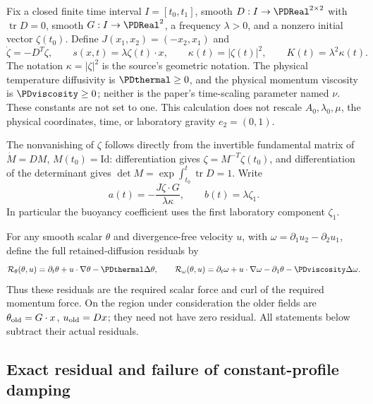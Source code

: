 Fix a closed finite time interval $I=[t_0,t_1]$, smooth
$D:I\to\PDReal^{2\times2}$ with $\operatorname{tr}D=0$, smooth
$G:I\to\PDReal^2$, a frequency $\lambda>0$, and a nonzero initial vector
$\zeta(t_0)$. Define $J(x_1,x_2)=(-x_2,x_1)$ and
\begin{equation}\label{cvlane:pd:eq:phase}
 \dot\zeta=-D^T\zeta,\qquad s(x,t)=\lambda\zeta(t)\cdot x,
 \qquad \kappa(t)=|\zeta(t)|^2,\qquad K(t)=\lambda^2\kappa(t).
\end{equation}
The notation $\kappa=|\zeta|^2$ is the source's geometric notation.
The physical temperature diffusivity is $\PDthermal\geq0$, and the physical
momentum viscosity is $\PDviscosity\geq0$; neither is the paper's time-scaling
parameter named $\nu$. These constants are not set to one. This calculation
does not rescale $A_0,\lambda_0,\mu$, the physical coordinates, time, or
laboratory gravity $e_2=(0,1)$.

The nonvanishing of $\zeta$ follows directly from the invertible fundamental
matrix of $\dot M=DM$, $M(t_0)=\mathrm{Id}$: differentiation gives
$\zeta=M^{-T}\zeta(t_0)$, and differentiation of the determinant gives
$\det M=\exp\int_{t_0}^t\operatorname{tr}D=1$.
Write
\begin{equation}\label{cvlane:pd:eq:ab}
 a(t)=-\frac{J\zeta\cdot G}{\lambda\kappa},\qquad
 b(t)=\lambda\zeta_1.
\end{equation}
In particular the buoyancy coefficient uses the first laboratory component
$\zeta_1$.

For any smooth scalar $\theta$ and divergence-free velocity $u$, with
$\omega=\partial_1u_2-\partial_2u_1$, define the full retained-diffusion
residuals by
\begin{equation}\label{cvlane:pd:eq:resdef}
 \mathcal R_\theta(\theta,u)
  =\partial_t\theta+u\cdot\nabla\theta-\PDthermal\Delta\theta,
 \qquad
 \mathcal R_\omega(\theta,u)
  =\partial_t\omega+u\cdot\nabla\omega-\partial_1\theta-\PDviscosity\Delta\omega.
\end{equation}
Thus these residuals are the required scalar force and curl of the required
momentum force. On the region under consideration the older fields are
$\theta_{\rm old}=G\cdot x$, $u_{\rm old}=Dx$; they need not have zero
residual. All statements below subtract their actual residuals.

\subsection{Exact residual and failure of constant-profile damping}

